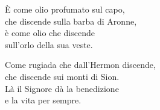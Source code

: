 

\spazio

\strofa È come olio profumato sul capo,\\
che discende sulla barba di Aronne,\\
è come olio che discende\\
sull'orlo della sua veste.

\spazio


\spazio

\strofa Come rugiada che dall'Hermon discende,\\
che discende sui monti di Sion.\\
Là il Signore dà la benedizione\\
e la vita per sempre.

\spazio

